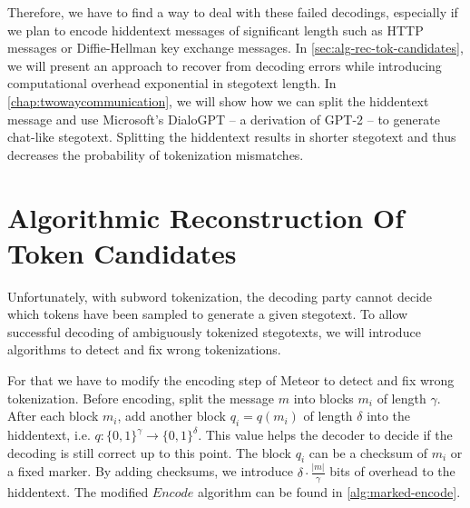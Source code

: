 
Therefore, we have to find a way to deal with these failed decodings, especially if we plan to encode hiddentext messages of significant length such as HTTP messages or Diffie-Hellman key exchange messages.
In \autoref{sec:alg-rec-tok-candidates}, we will present an approach to recover from decoding errors while introducing computational overhead exponential in stegotext length. 
In \autoref{chap:twowaycommunication}, we will show how we can split the hiddentext message and use Microsoft's DialoGPT -- a derivation of GPT-2 -- to generate chat-like stegotext.
Splitting the hiddentext results in shorter stegotext and thus decreases the probability of tokenization mismatches.



\section{Algorithmic Reconstruction Of Token Candidates}
\label{sec:alg-rec-tok-candidates}

Unfortunately, with subword tokenization, the decoding party cannot decide which tokens have been sampled to generate a given stegotext.
To allow successful decoding of ambiguously tokenized stegotexts, we will introduce algorithms to detect and fix wrong tokenizations.


For that we have to modify the encoding step of Meteor to detect and fix wrong tokenization.
Before encoding, split the message $m$ into blocks $m_i$ of length $\gamma$. 
After each block $m_i$, add another block $q_i = q(m_i)$ of length $\delta$ into the hiddentext, i.e. $q \colon \{ 0,1 \}^\gamma \rightarrow \{ 0,1 \}^\delta$.
This value helps the decoder to decide if the decoding is still correct up to this point.
The block $q_i$ can be a checksum of $m_i$ or a fixed marker.
By adding checksums, we introduce $\delta \cdot \frac{|m|}{\gamma}$ bits of overhead to the hiddentext.
The modified $Encode$ algorithm can be found in \autoref{alg:marked-encode}.

